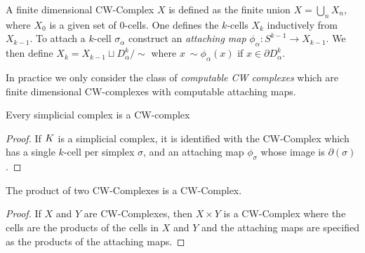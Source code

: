 \begin{definition}[CW-Complex]
 A finite dimensional CW-Complex $X$ is defined as the finite union $X = \bigcup_n X_n$, where $X_0$ is a given set of $0$-cells. One defines the $k$-cells $X_k$ inductively from $X_{k-1}$. To attach a $k$-cell $\sigma_\alpha$ construct an \emph{attaching map} $\phi_\alpha: S^{k-1} \rightarrow X_{k-1}$. We then define $X_k = X_{k-1} \sqcup D^k_\alpha / \sim$ where $x ~\sim \phi_\alpha(x)$ if $x \in \partial D^k_\alpha$. 
\end{definition}
In practice we only consider the class of  \emph{computable CW complexes} which are finite dimensional CW-complexes with computable attaching maps.
\begin{lemma}
Every simplicial complex is a CW-complex
\label{lem:simp-is-cw}
\end{lemma}
\begin{proof}
If $K$ is a simplicial complex, it is identified with the CW-Complex which has a single $k$-cell per simplex $\sigma$, and an attaching map $\phi_\sigma$ whose image is $\partial(\sigma)$.  
\end{proof}
\begin{lemma}
The product of two CW-Complexes is a CW-Complex.
\label{lem:cw-complex-product}
\end{lemma}
\begin{proof}
If $X$ and $Y$ are CW-Complexes, then $X \times Y$ is a CW-Complex where the cells are the products of the cells in $X$ and $Y$ and the attaching maps are specified as the products of the attaching maps.
\end{proof}

